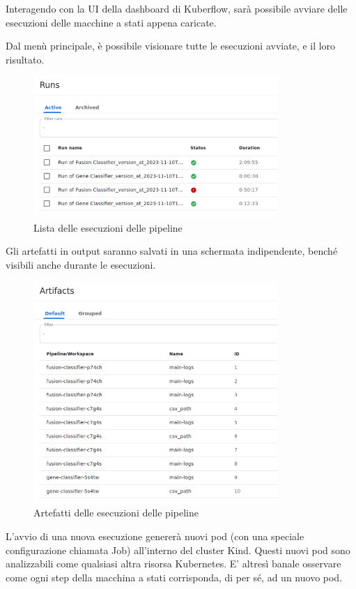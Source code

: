 Interagendo con la UI della dashboard di Kuberflow, sarà possibile avviare delle esecuzioni delle macchine a stati appena caricate. 

Dal menù principale, è possibile visionare tutte le esecuzioni avviate, e il loro risultato.

\begin{figure}[H]
    \centering
    \includegraphics[width=350px]{figures/ch4and5/runs.png}
    \caption[Lista delle esecuzioni delle pipeline]{Lista delle esecuzioni delle pipeline}
    \label{fig:cha6:runs}
\end{figure}

Gli artefatti in output saranno salvati in una schermata indipendente, benché visibili anche durante le esecuzioni.

\begin{figure}[H]
    \centering
    \includegraphics[width=350px]{figures/ch4and5/artifacts.png}
    \caption[Artefatti delle esecuzioni delle pipeline]{Artefatti delle esecuzioni delle pipeline}
    \label{fig:cha6:art}
\end{figure}

L'avvio di una nuova esecuzione genererà nuovi pod (con una speciale configurazione chiamata Job) all'interno del cluster Kind. Questi nuovi pod sono analizzabili come qualsiasi altra risorsa Kubernetes. E' altresì banale osservare come ogni step della macchina a stati corrisponda, di per sé, ad un nuovo pod.

